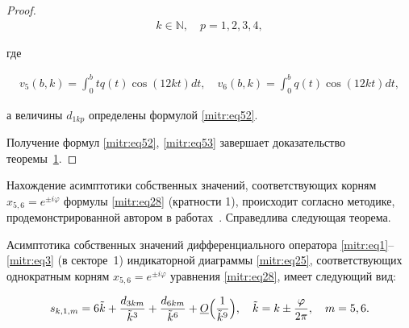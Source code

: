 \begin{proof}
\begin{multline}
k\in \mathbb{N}, \quad p=1,2,3,4,

\end{multline}

где

\begin{gather*}

v_5(b,k)=\int^b_0 t q(t)\cos(12kt)dt,\quad 

v_6(b,k)=\int^b_0  q(t)\cos(12kt)dt,

\end{gather*}

а величины $d_{1kp}$ определены формулой \eqref{mitr:eq52}.



Получение формул \eqref{mitr:eq52}, \eqref{mitr:eq53} завершает доказательство теоремы~\hyperlink{mitr:th1}{1}.

\end{proof}



\smallskip



Нахождение асимптотики собственных значений, соответствующих корням $x_{5,6}=e^{\pm i\varphi}$ формулы \eqref{mitr:eq28} (кратности 1), происходит согласно методике, продемонстрированной автором в работах~\cite{mitr:bib4,mitr:bib21,mitr:bib22}. Справедлива следующая теорема.



\smallskip



\hypertarget{mitr:th2}{}



\begin{theorem}[2]Асимптотика собственных значений дифференциального оператора \eqref{mitr:eq1}--\eqref{mitr:eq3} {\rm(}в секторе~{\rm1)} индикаторной диаграммы {\rm \eqref{mitr:eq25},} соответствующих однократным корням $x_{5,6}=e^{\pm i\varphi}$ уравнения {\rm \eqref{mitr:eq28},} имеет следующий вид\/{\rm:}

\begin{equation}

\label{mitr:eq54}

s_{k,1,m}={6\tilde k}+\frac{d_{3km}}{\tilde k^3}

+\frac{d_{6km}}{\tilde k^6}+

\underline O\Bigl(\frac1{\tilde k^9}\Bigr), \quad \tilde k=k\pm\frac{\varphi}{2\pi}, \quad m=5,6.

\end{equation}

\end{theorem}



